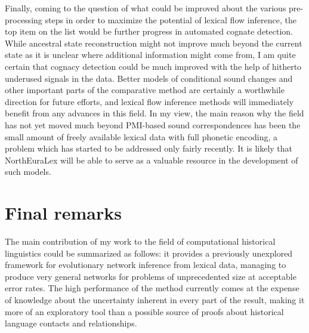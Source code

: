 Finally, coming to the question of what could be improved about the various pre-processing steps in order to maximize the potential of lexical flow inference, the top item on the list would be further progress in automated cognate detection. While ancestral state reconstruction might not improve much beyond the current state as it is unclear where additional information might come from, I am quite certain that cognacy detection could be much improved with the help of hitherto underused signals in the data. Better models of conditional sound changes and other important parts of the comparative method are certainly a worthwhile direction for future efforts, and lexical flow inference methods will immediately benefit from any advances in this field. In my view, the main reason why the field has not yet moved much beyond PMI-based sound correspondences has been the small amount of freely available lexical data with full phonetic encoding, a problem which has started to be addressed only fairly recently. It is likely that NorthEuraLex will be able to serve as a valuable resource in the development of such models.

\section{Final remarks}
The main contribution of my work to the field of computational historical linguistics could be summarized as follows: it provides a previously unexplored framework for evolutionary network inference from lexical data, managing to produce very general networks for problems of unprecedented size at acceptable error rates. The high performance of the method currently comes at the expense of knowledge about the uncertainty inherent in every part of the result, making it more of an exploratory tool than a possible source of proofs about historical language contacts and relationships.

